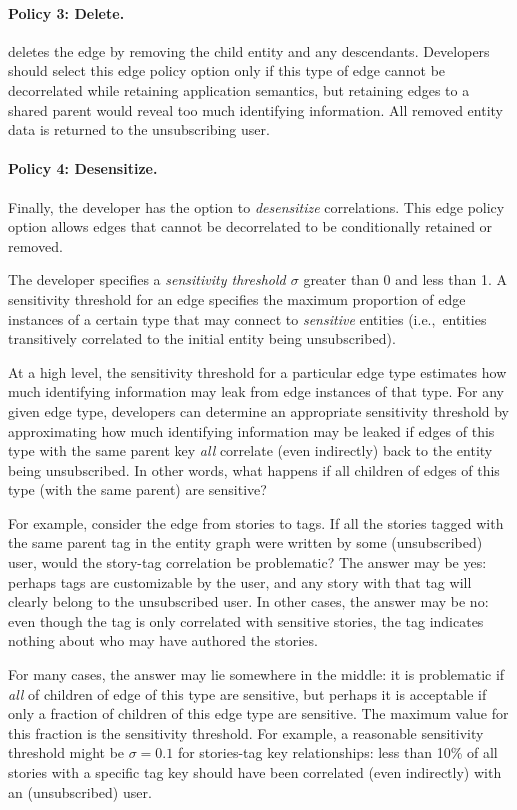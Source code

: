\paragraph{Policy 3: Delete.}
\sys deletes the edge by removing the child entity and any descendants.  Developers should select
this edge policy option only if this type of edge cannot be decorrelated while retaining application
semantics, but retaining edges to a shared parent would reveal too much identifying information.
All removed entity data is returned to the unsubscribing user.

\paragraph{Policy 4: Desensitize.}
Finally, the developer has the option to \emph{desensitize} correlations. This edge policy option
allows edges that cannot be decorrelated to be conditionally retained or removed.

The developer specifies a \emph{sensitivity threshold $\sigma$} greater than 0 and less than 1.  A
sensitivity threshold for an edge specifies the maximum proportion of edge instances of a certain
type that may connect to \emph{sensitive} entities (i.e.,\ entities transitively correlated to the
initial entity being unsubscribed). 

At a high level, the sensitivity threshold for a particular edge type estimates how much identifying
information may leak from edge instances of that type.  For any given edge type, developers can
determine an appropriate sensitivity threshold by approximating how much identifying information may
be leaked if edges of this type with the same parent key \emph{all} correlate (even indirectly) back
to the entity being unsubscribed. In other words, what happens if all children of edges of this type
(with the same parent) are sensitive?

For example, consider the edge from stories to tags. If all the stories tagged with the same parent
tag in the entity graph were written by some (unsubscribed) user, would the story-tag correlation be
problematic? The answer may be yes: perhaps tags are customizable by the user, and any story with
that tag will clearly belong to the unsubscribed user. In other cases, the answer may be no: even
though the tag is only correlated with sensitive stories, the tag indicates nothing about who may
have authored the stories.

For many cases, the answer may lie somewhere in the middle: it is problematic if \emph{all} of
children of edge of this type are sensitive, but perhaps it is acceptable if only a fraction of
children of this edge type are sensitive. The maximum value for this fraction is the sensitivity
threshold.  For example, a reasonable sensitivity threshold might be $\sigma = 0.1$ for stories-tag
key relationships: less than 10\% of all stories with a specific tag key should have been correlated
(even indirectly) with an (unsubscribed) user. 

